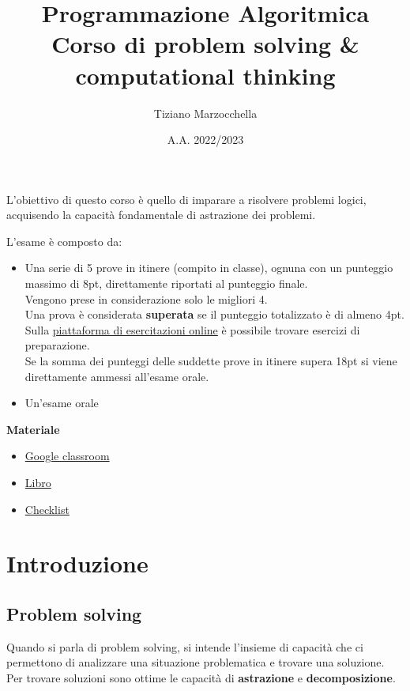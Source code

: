 \documentclass{article}
\title{
    Programmazione Algoritmica \\
    \large Corso di problem solving \& computational thinking
}
\author{Tiziano Marzocchella}
\date{A.A. 2022/2023}
\begin{document}


\noindent L'obiettivo di questo corso è quello di imparare a risolvere problemi logici, acquisendo la capacità fondamentale di astrazione dei problemi.

\noindent L'esame è composto da:
\begin{itemize}
    \item Una serie di 5 prove in itinere (compito in classe), ognuna con un punteggio massimo di 8pt, direttamente riportati al punteggio finale.\\
          Vengono prese in considerazione solo le migliori 4.\\
          Una prova è considerata \textbf{superata} se il punteggio totalizzato è di almeno 4pt.\\
          Sulla \href{https://evo.di.unipi.it/student/courses/7/practices}{piattaforma di esercitazioni online} è possibile trovare esercizi di preparazione.\\
          Se la somma dei punteggi delle suddette prove in itinere supera 18pt si viene direttamente ammessi all'esame orale.
    \item Un'esame orale
\end{itemize}

\noindent\textbf{Materiale}
\begin{itemize}
    \item \href{https://classroom.google.com/c/NDg5NzMxMzU4ODAx?cjc=qwfm6jd}{Google classroom}
    \item \href{https://t.me/c/1708877199/46}{Libro}
    \item \href{https://docs.google.com/document/d/1XU_2rwPUkni_s4h8Q-bLkLF9nwT4dSQA4DjgBqMaulg/edit?usp=drive_web&authuser=0}{Checklist}
\end{itemize}

\pagebreak %

\section{Introduzione}
\subsection{Problem solving}
Quando si parla di problem solving, si intende l'insieme di capacità che ci permettono di analizzare una situazione problematica e trovare una soluzione.\\
Per trovare soluzioni sono ottime le capacità di \textbf{astrazione} e \textbf{decomposizione}.
\end{document}
